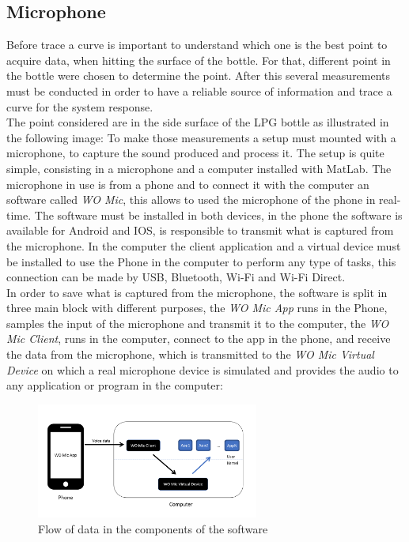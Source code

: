 \subsection{Microphone}
Before trace a curve is important to understand which one is the best point to acquire data, when hitting the surface of the bottle. For that, different point in the bottle were chosen to determine the point. After this several measurements must be conducted in order to have a reliable source of information and trace a curve for the system response.\\
The point considered are in the side surface of the LPG bottle as illustrated in the following image:
To make those measurements a setup must mounted with a microphone, to capture the sound produced and process it. The setup is quite simple, consisting in a microphone and a computer installed with MatLab. The microphone in use is from a phone and to connect it with the computer an software called \textit{WO Mic}, this allows to used the microphone of the phone in real-time. The software must be installed in both devices, in the phone the software is available for Android and IOS, is responsible to transmit what is captured from the microphone. In the computer the client application and a virtual device must be installed to use the Phone in the computer to perform any type of tasks, this connection can be made by USB, Bluetooth, Wi-Fi and Wi-Fi Direct.\\ 
In order to save what is captured from the microphone, the software is split in three main block with different purposes, the \textit{WO Mic App} runs in the Phone, samples the input of the microphone and transmit it to the computer, the \textit{WO Mic Client}, runs in the computer, connect to the app in the phone, and receive the data from the microphone, which is transmitted to the \textit{WO Mic Virtual Device} on which a real microphone device is simulated and provides the audio to any application or program in the computer\cite{WOMicFREE}:\\
\begin{figure}[!htb]
    \centering
    \includegraphics[width=0.65\textwidth]{Chapters/3CHP/Images/WOMICDiag.png}
    \caption{Flow of data in the components of the software\cite{WOMicFREE}}
    \label{fig:diagramWOMIC}
\end{figure}
